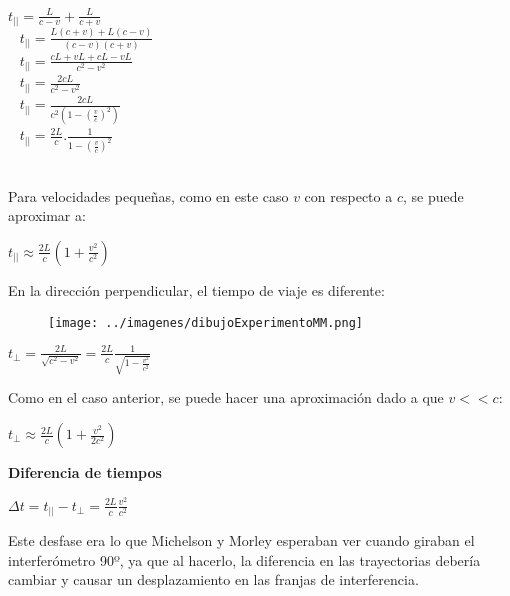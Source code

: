 \documentclass[a4paper]{article}
\begin{document}
		\begin{center}
			${t_{||}} = {\frac{L}{c-v}} + {\frac{L}{c+v}}$ \\ \
			\newline
			${t_{||}} = \frac{L(c+v) + L(c-v)}{(c-v)(c+v)}$ \\ \
			\newline
			${t_{||}} = \frac{cL + vL + cL - vL}{c^2 - v^2}$ \\ \
			\newline
			${t_{||}} = \frac{2cL}{c^2 - v^2}$ \\ \
			\newline
			${t_{||}} = \frac{2cL} {c^2(1 - (\frac{v}{c})^2)}$ \\ \
			\newline
			${t_{||}} = {\frac{2L}{c}} . \frac {1}{1- (\frac{v}{c})^2}$ \\ \
		\end{center}
		
		\indent Para velocidades pequeñas, como en este caso $v$ con respecto a $c$, se puede aproximar a:
		
		\begin{center}
			${t_{||}} \approx {\frac{2L}{c}} (1 + \frac{v^2}{c^2})$
		\end{center}
		
		\indent En la dirección perpendicular, el tiempo de viaje es diferente:
		\begin{figure}[h!]
			\centering
			\texttt{[image: ../imagenes/dibujoExperimentoMM.png]}
			
			
		\end{figure}
		\begin{center}
			$t_{\perp} = \frac{2L}{\sqrt{c^2 - v^2}} = {\frac{2L}{c}} \frac{1}{\sqrt{1 - \frac{v^2}{c^2}}}$  
		\end{center}
		
		\indent Como en el caso anterior, se puede hacer una aproximación dado a que $v << c$:
		
		\begin{center}
			${t_{\perp}} \approx {\frac{2L}{c}} (1 + \frac{v^2}{2c^2})$
		\end{center}
		
		\textbf{Diferencia de tiempos}
		
		\begin{center}
			$\Delta t = {t_{||}} - {t_{\perp}} = {\frac{2L}{c}} {\frac{v^2}{c^2}}$
		\end{center}
		
		\indent Este desfase era lo que Michelson y Morley esperaban ver cuando giraban el interferómetro 90º, ya que al hacerlo, la diferencia en las trayectorias debería cambiar y causar un desplazamiento en las franjas de interferencia.
		
\end{document}

